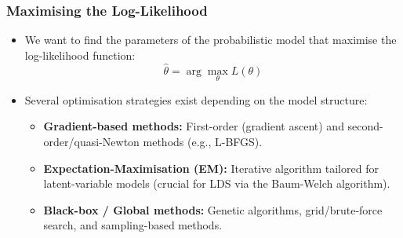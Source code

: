 \begin{frame}
    \frametitle{Maximising the Log-Likelihood}
    
    \begin{itemize}
        \item We want to find the parameters of the probabilistic model that maximise the log-likelihood function:
        $$\hat{\theta} = \arg\max_{\theta} L(\theta)$$
        
        \item Several optimisation strategies exist depending on the model structure:
        \begin{itemize}
            \item \textbf{Gradient-based methods:} First-order (gradient ascent) and second-order/quasi-Newton methods (e.g., L-BFGS).
            \item \textbf{Expectation-Maximisation (EM):} Iterative algorithm tailored for latent-variable models (crucial for LDS via the Baum-Welch algorithm).
            \item \textbf{Black-box / Global methods:} Genetic algorithms, grid/brute-force search, and sampling-based methods.
        \end{itemize}
    \end{itemize}
    \hfill\tiny\citet{bishop06}
    
\end{frame}

